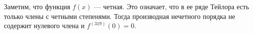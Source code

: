 \documentclass{article}
\begin{document}
Заметим, что функция $f(x)$ --- четная. Это означает, что в ее ряде Тейлора есть только члены с четными степенями. Тогда производная нечетного порядка не содержит нулевого члена и $f^{(319)} (0) = 0$.
\end{document}
